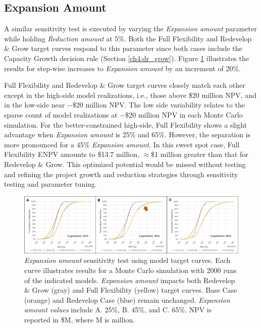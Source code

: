 \subsection{Expansion Amount}
\label{ch6:sens_expamt}

A similar sensitivity test is executed by varying the \textit{Expansion amount} parameter while holding \textit{Reduction amount} at 5\%. Both the Full Flexibility and Redevelop \& Grow target curves respond to this parameter since both cases include the Capacity Growth decision rule (Section \ref{ch4:dr_grow}). Figure \ref{fig:sens_test_expansion} illustrates the results for step-wise increases to \textit{Expansion amount} by an increment of 20\%. 

Full Flexibility and Redevelop \& Grow target curves closely match each other except in the high-side model realizations, i.e., those above \$20 million NPV, and in the low-side near $-\$$20 million NPV. The low side variability relates to the sparse count of model realizations at $-\$$20 million NPV in each Monte Carlo simulation. For the better-constrained high-side, Full Flexibility shows a slight advantage when \textit{Expansion amount} is 25\% and 65\%. However, the separation is more pronounced for a 45\% \textit{Expansion amount}. In this sweet spot case, Full Flexibility ENPV amounts to \$13.7 million, $\approx\$1$ million greater than that for Redevelop \& Grow. This optimized potential would be missed without testing and refining the project growth and reduction strategies through sensitivity testing and parameter tuning.

\begin{figure}[!htp]
\centering
\includegraphics[width=.98\textwidth]{templates/images/Figure-Sensitivity_Expansion_Amount.png}
\caption[Expansion Amount sensitivity test]{\textit{Expansion amount} sensitivity test using model target curves. Each curve illustrates results for a Monte Carlo simulation with 2000 runs of the indicated models. \textit{Expansion amount} impacts both Redevelop \& Grow (gray) and Full Flexibility (yellow) target curves. Base Case (orange) and Redevelop Case (blue) remain unchanged. \textit{Expansion amount values} include A. 25\%, B. 45\%, and C. 65\%. NPV is reported in \$M, where M is million.}
\label{fig:sens_test_expansion}
\end{figure}


